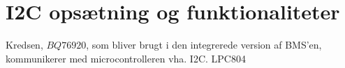 \section{I2C opsætning og funktionaliteter}

Kredsen, $BQ76920$, som bliver brugt i den integrerede version af BMS'en, kommunikerer med microcontrolleren vha. I2C. LPC804 

